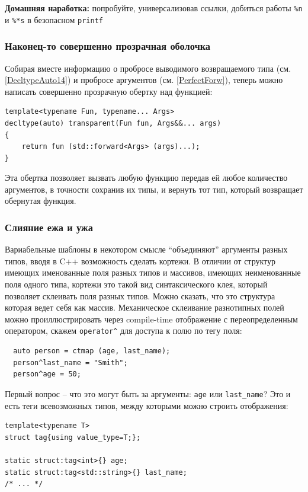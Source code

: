 \documentclass[a4paper,12pt,oneside]{article}
\begin{document}
\textbf{Домашняя наработка:} попробуйте, универсализовав ссылки, добиться работы \lstinline!%n! и \lstinline!%*s! в безопасном \lstinline!printf!

\subsubsection{Наконец-то совершенно прозрачная оболочка}\label{PerfectCloth}

Собирая вместе информацию о пробросе выводимого возвращаемого типа (см. \ref{DecltypeAuto14}) и пробросе аргументов (см. \ref{PerfectForw}), теперь можно написать совершенно прозрачную обертку над функцией:

\begin{lstlisting}
template<typename Fun, typename... Args>
decltype(auto) transparent(Fun fun, Args&&... args) 
{ 
    return fun (std::forward<Args> (args)...); 
}
\end{lstlisting}

Эта обертка позволяет вызвать любую функцию передав ей любое количество аргументов, в точности сохранив их типы, и вернуть тот тип, который возвращает обернутая функция.

\subsubsection{Слияние ежа и ужа}

Вариабельные шаблоны в некотором смысле ``объединяют'' аргументы разных типов, вводя в C++ возможность сделать кортежи. В отличии от структур имеющих именованные поля разных типов и массивов, имеющих неименованные поля одного типа, кортежи это такой вид синтаксического клея, который позволяет склеивать поля разных типов. Можно сказать, что это структура которая ведет себя как массив. Механическое склеивание разнотипных полей можно проиллюстрировать через compile-time отображение с переопределенным оператором, скажем \lstinline!operator^! для доступа к полю по тегу поля:

\begin{lstlisting}
  auto person = ctmap (age, last_name);
  person^last_name = "Smith";
  person^age = 50;
\end{lstlisting}

Первый вопрос -- что это могут быть за аргументы: \lstinline!age! или \lstinline!last_name!? Это и есть теги всевозможных типов, между которыми можно строить отображения:

\begin{lstlisting}
template<typename T>
struct tag{using value_type=T;};

static struct:tag<int>{} age;
static struct:tag<std::string>{} last_name;
/* ... */
\end{lstlisting}
\end{document}
